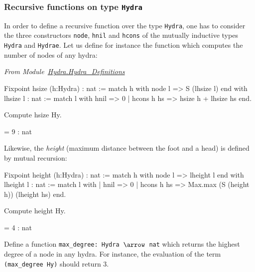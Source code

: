 \subsubsection{Recursive functions on type \texttt{Hydra}}
\label{sec:orgheadline41}
\label{sec:hsize-def}




In order to  define a recursive function over the type \texttt{Hydra}, one has to consider the three constructors 
\texttt{node}, \texttt{hnil} and \texttt{hcons} of the mutually inductive types \texttt{Hydra} and \texttt{Hydrae}. 
Let us define for instance the function which  computes the number of nodes of any hydra:

\vspace{4pt}
\noindent
\emph{From Module~\href{../theories/html/hydras.Hydra.Hydra_Definitions.html}{Hydra.Hydra\_Definitions}}


\begin{Coqsrc}
Fixpoint hsize (h:Hydra) : nat :=
  match h with node l => S (lhsize l)
  end
with lhsize l : nat :=
  match l with hnil => 0
            | hcons h hs => hsize h + lhsize hs 
  end.

 Compute hsize Hy.
\end{Coqsrc}

\begin{Coqanswer}
 = 9
     : nat 
\end{Coqanswer}


Likewise, the \emph{height} (maximum distance between the foot and a head) 
is defined by mutual recursion:

\begin{Coqsrc}
Fixpoint height  (h:Hydra) : nat :=
  match h with node l => lheight l
  end
with lheight l : nat :=
  match l with 
  | hnil => 0
  | hcons h hs => Max.max (S (height h)) (lheight hs)
  end.
\end{Coqsrc}

\begin{Coqsrc}
Compute height Hy.
\end{Coqsrc}

\begin{Coqanswer}
 = 4
     : nat  
\end{Coqanswer}


\begin{exercise}
Define a function \texttt{max\_degree: Hydra $\arrow$ nat} which  returns the highest degree of a node in any hydra. For instance, the evaluation of the term \texttt{(max\_degree Hy)} should return $3$.
\end{exercise}

